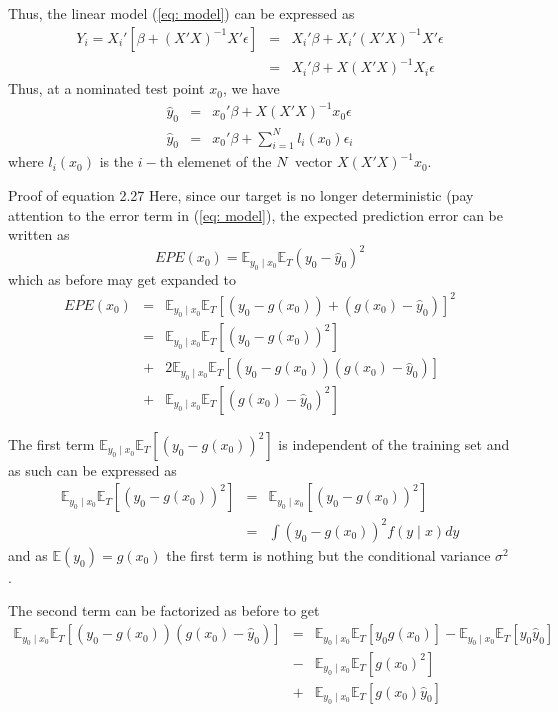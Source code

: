 \documentclass{beamer}
\newcommand{\E}{\mathbb{E}}
\begin{document}
\begin{frame}
Thus, the linear model (\ref{eq: model}) can be expressed as
\begin{eqnarray*}
Y_i=X_i'[\beta+(X'X)^{-1}X'\epsilon]&=&X_i'\beta+X_i'(X'X)^{-1}X'\epsilon\\
&=&X_i'\beta+X(X'X)^{-1}X_i\epsilon
\end{eqnarray*}
Thus, at a nominated test point $x_0$, we have
\begin{eqnarray*}
\hat{y}_0&=&x_0'\beta+X(X'X)^{-1}x_0\epsilon\\
\hat{y}_0&=&x_0'\beta+\sum\limits_{i=1}^{N}l_i(x_0)\epsilon_i
\end{eqnarray*}
where $l_i(x_0)$ is the $i-$th elemenet of the $N\time1$ vector $X(X'X)^{-1}x_0$.
\end{frame}
\begin{frame}{Proof of equation 2.27}
Here, since our target is no longer deterministic (pay attention to the error term in (\ref{eq: model}), the expected prediction error can be written as 
\begin{equation}
EPE(x_0)=\E_{y_0\mid x_0}\E_T(y_0-\hat{y}_0)^2
\end{equation}
which as before may get expanded to
\begin{eqnarray*}
EPE(x_0)&=&\E_{y_0\mid x_0}\E_T[(y_0-g(x_0))+(g(x_0)-\hat{y}_0)]^2\\
&=&\E_{y_0\mid x_0}\E_T[(y_0-g(x_0))^2]\\
&+&2\E_{y_0\mid x_0}\E_T[(y_0-g(x_0))(g(x_0)-\hat{y}_0)]\\
&+&\E_{y_0\mid x_0}\E_T[(g(x_0)-\hat{y}_0)^2]
\end{eqnarray*} 
\end{frame}
\begin{frame}
The first term $\E_{y_0\mid x_0}\E_T[(y_0-g(x_0))^2]$ is independent of the training set and as such can be expressed as 
\begin{eqnarray*}
\E_{y_0\mid x_0}\E_T[(y_0-g(x_0))^2]&=&\E_{y_0\mid x_0}[(y_0-g(x_0))^2]\\
&=&\int (y_0-g(x_0))^2 f(y\mid x)dy
\end{eqnarray*}
and as $\E(y_0)=g(x_0)$ the first term is nothing but the conditional variance $\sigma^2$.

The second term can be factorized as before  to get
\begin{eqnarray*}
\E_{y_0\mid x_0}\E_T[(y_0-g(x_0))(g(x_0)-\hat{y}_0)]&=&\E_{y_0\mid x_0}\E_T[y_0g(x_0)]-\E_{y_0\mid x_0}\E_T[y_0\hat{y}_0]\\
&-&\E_{y_0\mid x_0}\E_T[g(x_0)^2]\\
&+&\E_{y_0\mid x_0}\E_T[g(x_0)\hat{y}_0]
\end{eqnarray*}
\end{frame}
\end{document}
